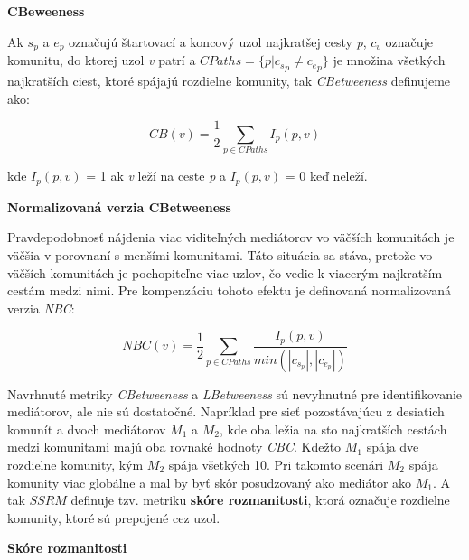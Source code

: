 \documentclass[slovak,master,public,dept460,male,cpdeclaration,oneside]{diploma}
\begin{document}
\newpage
\noindent \textbf{CBeweeness}
\begin{definition}
Ak \textit{${s_p}$} a \textit{${e_p}$} označujú štartovací a koncový uzol najkratšej cesty \textit{p}, \textit{${c_v}$} označuje komunitu, do ktorej uzol \textit{v} patrí a \textit{${CPaths = \{ p | {c_s}_p \neq {c_e}_p} \}$} je množina všetkých najkratších ciest, ktoré spájajú rozdielne komunity, tak \textit{CBetweeness} definujeme ako: 


\begin{equation}
{CB(v) = \frac{1}{2} \sum_{p \in CPaths} I_{p}(p, v)}
\end{equation}

kde ${I_p(p, v)}$ = 1 ak \textit{v} leží na ceste \textit{p} a  ${I_p(p, v)}$ = 0 keď neleží.
\label{equation_CBeweeness}
\end{definition}


\bigskip
\noindent \textbf{Normalizovaná verzia CBetweeness}

\noindent  Pravdepodobnosť nájdenia viac viditeľných mediátorov vo väčších komunitách je väčšia v porovnaní s menšími komunitami. Táto situácia sa stáva, pretože vo väčších komunitách je pochopiteľne viac uzlov, čo vedie k viacerým najkratším cestám medzi nimi. Pre kompenzáciu tohoto efektu je definovaná normalizovaná verzia \textit{NBC}: 



\begin{equation}
    NBC(v) = \frac{1}{2} \sum_{p \in CPaths} \frac{I_{p}(p, v)}{min(|c_{s_{p}}|,|c_{e_{p}}|)}
\end{equation}







\noindent  Navrhnuté metriky \textit{CBetweeness} a \textit{LBetweeness} sú nevyhnutné pre identifikovanie mediátorov, ale nie sú dostatočné. Napríklad pre sieť pozostávajúcu z desiatich komunít a dvoch mediátorov \textit{${M_1}$}
a \textit{${M_2}$}, kde oba ležia na sto najkratších cestách medzi komunitami majú oba rovnaké hodnoty \textit{CBC}. Kdežto \textit{${M_1}$} spája dve rozdielne komunity, kým \textit{${M_2}$} spája všetkých 10. Pri takomto scenári \textit{${M_2}$} spája komunity viac globálne a mal by byť skôr posudzovaný ako mediátor ako \textit{${M_1}$}. A tak \textit{${SSRM}$} definuje tzv. metriku \textbf{skóre rozmanitosti}, ktorá označuje rozdielne komunity, ktoré sú prepojené cez uzol.

\bigskip
\noindent \textbf{Skóre rozmanitosti}
\end{document}

